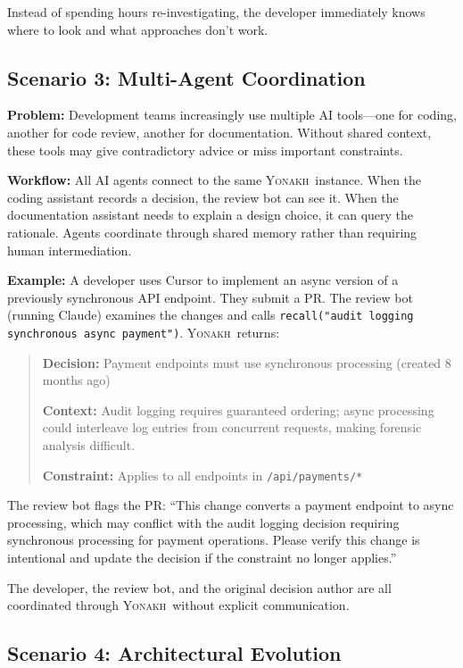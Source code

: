 \documentclass[10pt,journal,compsoc]{IEEEtran}
\newcommand{\yonakh}{\textsc{Yonakh}}
\begin{document}
Instead of spending hours re-investigating, the developer immediately knows where to look and what approaches don't work.

\subsection{Scenario 3: Multi-Agent Coordination}

\textbf{Problem:} Development teams increasingly use multiple AI tools---one for coding, another for code review, another for documentation. Without shared context, these tools may give contradictory advice or miss important constraints.

\textbf{Workflow:} All AI agents connect to the same \yonakh\ instance. When the coding assistant records a decision, the review bot can see it. When the documentation assistant needs to explain a design choice, it can query the rationale. Agents coordinate through shared memory rather than requiring human intermediation.

\textbf{Example:} A developer uses Cursor to implement an async version of a previously synchronous API endpoint. They submit a PR. The review bot (running Claude) examines the changes and calls \texttt{recall("audit logging synchronous async payment")}. \yonakh\ returns:

\begin{quote}
\textbf{Decision:} Payment endpoints must use synchronous processing (created 8 months ago)

\textbf{Context:} Audit logging requires guaranteed ordering; async processing could interleave log entries from concurrent requests, making forensic analysis difficult.

\textbf{Constraint:} Applies to all endpoints in \texttt{/api/payments/*}
\end{quote}

The review bot flags the PR: ``This change converts a payment endpoint to async processing, which may conflict with the audit logging decision requiring synchronous processing for payment operations. Please verify this change is intentional and update the decision if the constraint no longer applies.''

The developer, the review bot, and the original decision author are all coordinated through \yonakh\ without explicit communication.

\subsection{Scenario 4: Architectural Evolution}
\end{document}
